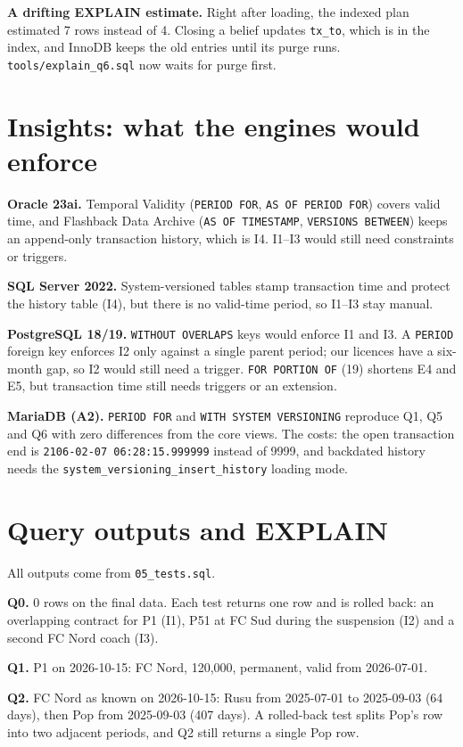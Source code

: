 \documentclass[10pt,a4paper]{article}
\newcommand{\code}[1]{\texttt{\small #1}}
\begin{document}
\textbf{A drifting EXPLAIN estimate.}  Right after loading, the indexed plan
estimated 7 rows instead of 4.  Closing a belief updates \code{tx\_to}, which is in
the index, and InnoDB keeps the old entries until its purge runs.
\code{tools/explain\_q6.sql} now waits for purge first.

\section{Insights: what the engines would enforce}
\textbf{Oracle 23ai.}  Temporal Validity (\code{PERIOD FOR}, \code{AS OF PERIOD
FOR}) covers valid time, and Flashback Data Archive (\code{AS OF TIMESTAMP},
\code{VERSIONS BETWEEN}) keeps an append-only transaction history, which is I4.
I1--I3 would still need constraints or triggers.

\textbf{SQL Server 2022.}  System-versioned tables stamp transaction time and protect
the history table (I4), but there is no valid-time period, so I1--I3 stay manual.

\textbf{PostgreSQL 18/19.}  \code{WITHOUT OVERLAPS} keys would enforce I1 and I3.  A
\code{PERIOD} foreign key enforces I2 only against a single parent period; our
licences have a six-month gap, so I2 would still need a trigger.  \code{FOR PORTION
OF} (19) shortens E4 and E5, but transaction time still needs triggers or an
extension.

\textbf{MariaDB (A2).}  \code{PERIOD FOR} and \code{WITH SYSTEM VERSIONING} reproduce
Q1, Q5 and Q6 with zero differences from the core views.  The costs: the open
transaction end is \code{2106-02-07 06:28:15.999999} instead of 9999, and backdated
history needs the \code{system\_versioning\_insert\_history} loading mode.

\section{Query outputs and EXPLAIN}
All outputs come from \code{05\_tests.sql}.

\textbf{Q0.}  0 rows on the final data.  Each test returns one row and is rolled
back: an overlapping contract for P1 (I1), P51 at FC Sud during the suspension (I2)
and a second FC Nord coach (I3).

\textbf{Q1.}  P1 on 2026-10-15: FC Nord, 120,000, permanent, valid from 2026-07-01.

\textbf{Q2.}  FC Nord as known on 2026-10-15: Rusu from 2025-07-01 to 2025-09-03
(64 days), then Pop from 2025-09-03 (407 days).  A rolled-back test splits Pop's row
into two adjacent periods, and Q2 still returns a single Pop row.
\end{document}

